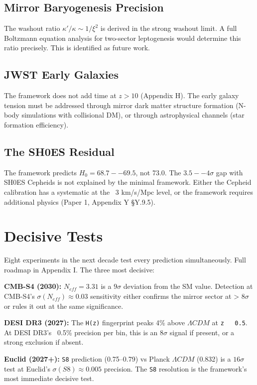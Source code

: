 \documentclass[aps,prd,preprint,superscriptaddress,longbibliography]{revtex4-2}
\begin{document}
\subsection{Mirror Baryogenesis Precision}

The washout ratio $\kappa'/\kappa \sim  1/\xi^{2}$ is derived in the strong washout limit. A full Boltzmann equation analysis for two-sector leptogenesis would determine this ratio precisely. This is identified as future work.


\subsection{JWST Early Galaxies}

The framework does not add time at $z > 10$ (Appendix H). The early galaxy tension must be addressed through mirror dark matter structure formation (N-body simulations with collisional DM), or through astrophysical channels (star formation efficiency).


\subsection{The SH0ES Residual}

The framework predicts $H_{0} = 68.7--69.5$, not 73.0. The $3.5--4\sigma$ gap with SH0ES Cepheids is not explained by the minimal framework. Either the Cepheid calibration has a systematic at the ~3 km/s/Mpc level, or the framework requires additional physics (Paper 1, Appendix Y \S{}Y.9.5).



\section{Decisive Tests}

Eight experiments in the next decade test every prediction simultaneously. Full roadmap in Appendix I. The three most decisive:

\textbf{CMB-S4 (2030):} $N_{eff} = 3.31$ is a $9\sigma$ deviation from the SM value. Detection at CMB-S4's $\sigma(N_{eff}) \approx 0.03$ sensitivity either confirms the mirror sector at > $8\sigma$ or rules it out at the same significance.

\textbf{DESI DR3 (2027):} The \texttt{H(z)} fingerprint peaks 4\% above $\Lambda CDM$ at \texttt{z ~ 0.5}. At DESI DR3's ~0.5\% precision per bin, this is an $8\sigma$ signal if present, or a strong exclusion if absent.

\textbf{Euclid (2027+):} \texttt{S8} prediction (0.75--0.79) vs Planck $\Lambda CDM$ (0.832) is a $16\sigma$ test at Euclid's $\sigma(S8) \approx 0.005$ precision. The \texttt{S8} resolution is the framework's most immediate decisive test.
\end{document}

